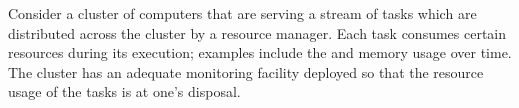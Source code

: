 Consider a cluster of computers that are serving a stream of tasks which are
distributed across the cluster by a resource manager. Each task consumes certain
resources during its execution; examples include the  and memory usage
over time. The cluster has an adequate monitoring facility deployed so that the
resource usage of the tasks is at one's disposal.
